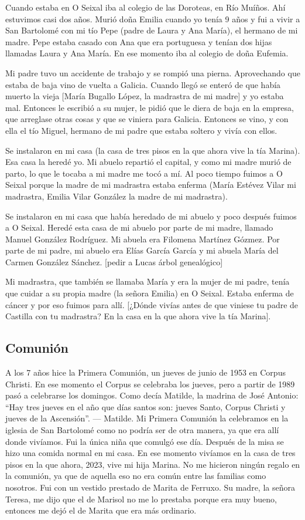 \documentclass[12pt,a5paper]{book}
\begin{document}
Cuando estaba en O Seixal iba al colegio de las Doroteas, en Río Muíños. Ahí estuvimos casi dos años. Murió doña Emilia cuando yo tenía 9 años y fui a vivir a San Bartolomé con mi tío Pepe (padre de Laura y Ana María), el hermano de mi madre. Pepe estaba casado con Ana que era portuguesa y tenían dos hijas llamadas Laura y Ana María. En ese momento iba al colegio de doña Eufemia. 

Mi padre tuvo un accidente de trabajo y se rompió una pierna. Aprovechando que estaba de baja vino de vuelta a Galicia. Cuando llegó se enteró de que había muerto la vieja [María Bugallo López, la madrastra de mi madre] y yo estaba mal. Entonces le escribió a su mujer, le pidió que le diera de baja en la empresa, que arreglase otras cosas y que se viniera para Galicia. Entonces se vino, y con ella el tío Miguel, hermano de mi padre que estaba soltero y vivía con ellos.

Se instalaron en mi casa (la casa de tres pisos en la que ahora vive la tía Marina). Esa casa la heredé yo. Mi abuelo repartió el capital, y como mi madre murió de parto, lo que le tocaba a mi madre me tocó a mí. Al poco tiempo fuimos a O Seixal porque la madre de mi madrastra estaba enferma (María Estévez Vilar mi madrastra, Emilia Vilar González la madre de mi madrastra).

Se instalaron en mi casa que había heredado de mi abuelo y poco después fuimos a  O Seixal. Heredé esta casa de mi abuelo por parte de mi madre, llamado Manuel González Rodríguez. Mi abuela era Filomena Martínez Gózmez. Por parte de mi padre, mi abuelo era Elías García García y mi abuela María del Carmen González Sánchez. [pedir a Lucas árbol genealógico]

Mi madrastra, que también se llamaba María y era la mujer de mi padre, tenía que cuidar a su propia madre (la señora Emilia) en O Seixal. Estaba enferma de cáncer y por eso fuimos para allí. [¿Dónde vivías antes de que viniese tu padre de Castilla con tu madrastra? En la casa en la que ahora vive la tía Marina].


\subsection*{Comunión}

A los 7 años hice la Primera Comunión, un jueves de junio de 1953 en Corpus Christi. En ese momento el Corpus se celebraba los jueves, pero a partir de 1989 pasó a celebrarse los domingos. Como decía Matilde, la madrina de José Antonio:
“Hay tres jueves en el año que días santos son: jueves Santo, Corpus Christi y jueves de la Ascensión”.  — Matilde.
Mi Primera Comunión la celebramos en la iglesia de San Bartolomé como no podría ser de otra manera, ya que era allí donde vivíamos. Fui la única niña que comulgó ese día. Después de la misa se hizo una comida normal en mi casa. En ese momento vivíamos en la casa de tres pisos en la que ahora, 2023, vive mi hija Marina.
No me hicieron ningún regalo en la comunión, ya que de aquella eso no era común entre las familias como nosotros. Fui con un vestido prestado de Marita de Ferruxo. Su madre, la señora Teresa, me dijo que el de Marisol no me lo prestaba porque era muy bueno, entonces me dejó el de Marita que era más ordinario.
\end{document}
